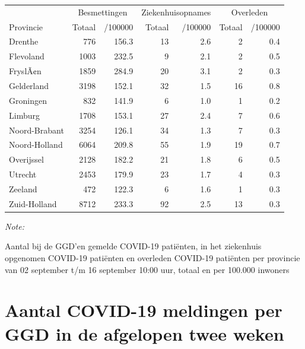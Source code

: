 \documentclass[
  english,
  man,floatsintext]{apa6}
\begin{document}
\begin{table}
\centering
\begin{threeparttable}
\begin{tabular}{lrrrrrr}
\toprule
\multicolumn{1}{c}{ } & \multicolumn{2}{c}{Besmettingen} & \multicolumn{2}{c}{Ziekenhuisopnames} & \multicolumn{2}{c}{Overleden} \\
\cmidrule(l{3pt}r{3pt}){2-3} \cmidrule(l{3pt}r{3pt}){4-5} \cmidrule(l{3pt}r{3pt}){6-7}
Provincie & Totaal & /100000 & Totaal & /100000 & Totaal & /100000\\
\midrule
Drenthe & 776 & 156.3 & 13 & 2.6 & 2 & 0.4\\
Flevoland & 1003 & 232.5 & 9 & 2.1 & 2 & 0.5\\
FryslÃ¢n & 1859 & 284.9 & 20 & 3.1 & 2 & 0.3\\
Gelderland & 3198 & 152.1 & 32 & 1.5 & 16 & 0.8\\
Groningen & 832 & 141.9 & 6 & 1.0 & 1 & 0.2\\
Limburg & 1708 & 153.1 & 27 & 2.4 & 7 & 0.6\\
Noord-Brabant & 3254 & 126.1 & 34 & 1.3 & 7 & 0.3\\
Noord-Holland & 6064 & 209.8 & 55 & 1.9 & 19 & 0.7\\
Overijssel & 2128 & 182.2 & 21 & 1.8 & 6 & 0.5\\
Utrecht & 2453 & 179.9 & 23 & 1.7 & 4 & 0.3\\
Zeeland & 472 & 122.3 & 6 & 1.6 & 1 & 0.3\\
Zuid-Holland & 8712 & 233.3 & 92 & 2.5 & 13 & 0.3\\
\bottomrule
\end{tabular}
\begin{tablenotes}
\item \textit{Note: } 
\item Aantal bij de GGD’en gemelde COVID-19 patiënten, in het ziekenhuis opgenomen COVID-19 patiënten en overleden COVID-19 patiënten per provincie van 02 september t/m 16 september 10:00 uur, totaal en per 100.000 inwoners
\end{tablenotes}
\end{threeparttable}
\end{table}

\newpage

\hypertarget{aantal-covid-19-meldingen-per-ggd-in-de-afgelopen-twee-weken}{%
\section{Aantal COVID-19 meldingen per GGD in de afgelopen twee weken}\label{aantal-covid-19-meldingen-per-ggd-in-de-afgelopen-twee-weken}}
\end{document}
